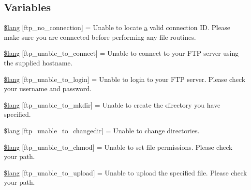 \subsection*{Variables}
\begin{DoxyCompactItemize}
\item 
\hyperlink{system_2language_2english_2ftp__lang_8php_a8630404f8e0c3750f8d997f35622b6eb}{\$lang} \mbox{[}\textquotesingle{}ftp\+\_\+no\+\_\+connection\textquotesingle{}\mbox{]} = \textquotesingle{}Unable to locate \hyperlink{_admin_2assets_2js_2bootstrap_8min_8js_a1f5870dcf487187f13d5fd328ed9e6e7}{a} valid connection I\+D. Please make sure you are connected before performing any file routines.\textquotesingle{}
\item 
\hyperlink{system_2language_2english_2ftp__lang_8php_a57d51cf019dd2e380b84c6e31cda0cf5}{\$lang} \mbox{[}\textquotesingle{}ftp\+\_\+unable\+\_\+to\+\_\+connect\textquotesingle{}\mbox{]} = \textquotesingle{}Unable to connect to your F\+T\+P server using the supplied hostname.\textquotesingle{}
\item 
\hyperlink{system_2language_2english_2ftp__lang_8php_affe13cbf898e1802abb3cd9d9ce2db97}{\$lang} \mbox{[}\textquotesingle{}ftp\+\_\+unable\+\_\+to\+\_\+login\textquotesingle{}\mbox{]} = \textquotesingle{}Unable to login to your F\+T\+P server. Please check your username and password.\textquotesingle{}
\item 
\hyperlink{system_2language_2english_2ftp__lang_8php_acd954089043ea7ad47397376e2630d87}{\$lang} \mbox{[}\textquotesingle{}ftp\+\_\+unable\+\_\+to\+\_\+mkdir\textquotesingle{}\mbox{]} = \textquotesingle{}Unable to create the directory you have specified.\textquotesingle{}
\item 
\hyperlink{system_2language_2english_2ftp__lang_8php_a2e8eab1a2d2d33cde249097df270b7df}{\$lang} \mbox{[}\textquotesingle{}ftp\+\_\+unable\+\_\+to\+\_\+changedir\textquotesingle{}\mbox{]} = \textquotesingle{}Unable to change directories.\textquotesingle{}
\item 
\hyperlink{system_2language_2english_2ftp__lang_8php_a9ffd10144a0dfd5a3c7ab69e4edf1fdf}{\$lang} \mbox{[}\textquotesingle{}ftp\+\_\+unable\+\_\+to\+\_\+chmod\textquotesingle{}\mbox{]} = \textquotesingle{}Unable to set file permissions. Please check your path.\textquotesingle{}
\item 
\hyperlink{system_2language_2english_2ftp__lang_8php_a1fd0c9f4e0f3be691a809ce804900ed7}{\$lang} \mbox{[}\textquotesingle{}ftp\+\_\+unable\+\_\+to\+\_\+upload\textquotesingle{}\mbox{]} = \textquotesingle{}Unable to upload the specified file. Please check your path.\textquotesingle{}

\end{DoxyCompactItemize}
